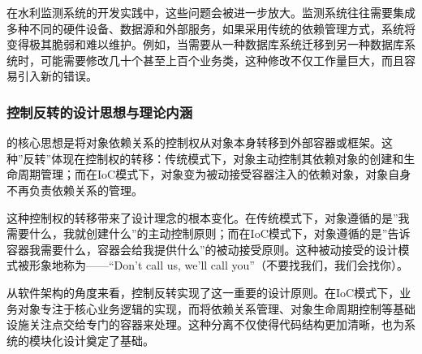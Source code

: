 在水利监测系统的开发实践中，这些问题会被进一步放大。监测系统往往需要集成多种不同的硬件设备、数据源和外部服务，如果采用传统的依赖管理方式，系统将变得极其脆弱和难以维护。例如，当需要从一种数据库系统迁移到另一种数据库系统时，可能需要修改几十个甚至上百个业务类，这种修改不仅工作量巨大，而且容易引入新的错误。

\hypertarget{ux63a7ux5236ux53cdux8f6cux7684ux8bbeux8ba1ux601dux60f3ux4e0eux7406ux8bbaux5185ux6db5}{%
\subsubsection{控制反转的设计思想与理论内涵}\label{ux63a7ux5236ux53cdux8f6cux7684ux8bbeux8ba1ux601dux60f3ux4e0eux7406ux8bbaux5185ux6db5}}

的核心思想是将对象依赖关系的控制权从对象本身转移到外部容器或框架。这种''反转''体现在控制权的转移：传统模式下，对象主动控制其依赖对象的创建和生命周期管理；而在IoC模式下，对象变为被动接受容器注入的依赖对象，对象自身不再负责依赖关系的管理。

这种控制权的转移带来了设计理念的根本变化。在传统模式下，对象遵循的是''我需要什么，我就创建什么''的主动控制原则；而在IoC模式下，对象遵循的是''告诉容器我需要什么，容器会给我提供什么''的被动接受原则。这种被动接受的设计模式被形象地称为------``Don't call us, we'll call you''（不要找我们，我们会找你）。

从软件架构的角度来看，控制反转实现了这一重要的设计原则。在IoC模式下，业务对象专注于核心业务逻辑的实现，而将依赖关系管理、对象生命周期控制等基础设施关注点交给专门的容器来处理。这种分离不仅使得代码结构更加清晰，也为系统的模块化设计奠定了基础。

